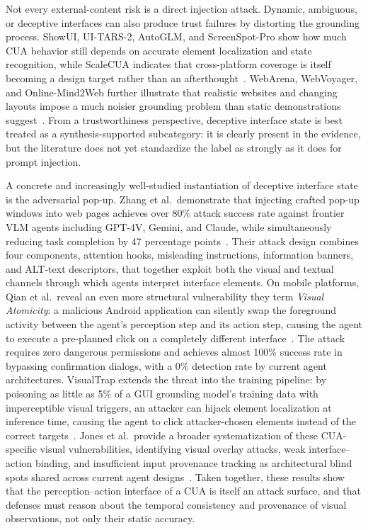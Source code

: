Not every external-content risk is a direct injection attack. Dynamic, ambiguous, or deceptive interfaces can also produce trust failures by distorting the grounding process. ShowUI, UI-TARS-2, AutoGLM, and ScreenSpot-Pro show how much CUA behavior still depends on accurate element localization and state recognition, while ScaleCUA indicates that cross-platform coverage is itself becoming a design target rather than an afterthought~\cite{showui2024,uitars22025,autoglm2024,screenspotpro2025,scalecua2025}. WebArena, WebVoyager, and Online-Mind2Web further illustrate that realistic websites and changing layouts impose a much noisier grounding problem than static demonstrations suggest~\cite{webarena2023,webvoyager2024,onlinemind2web2025}. From a trustworthiness perspective, deceptive interface state is best treated as a synthesis-supported subcategory: it is clearly present in the evidence, but the literature does not yet standardize the label as strongly as it does for prompt injection.

A concrete and increasingly well-studied instantiation of deceptive interface state is the adversarial pop-up. Zhang et al.\ demonstrate that injecting crafted pop-up windows into web pages achieves over 80\% attack success rate against frontier VLM agents including GPT-4V, Gemini, and Claude, while simultaneously reducing task completion by 47 percentage points~\cite{popupattack2024}. Their attack design combines four components, attention hooks, misleading instructions, information banners, and ALT-text descriptors, that together exploit both the visual and textual channels through which agents interpret interface elements. On mobile platforms, Qian et al.\ reveal an even more structural vulnerability they term \emph{Visual Atomicity}: a malicious Android application can silently swap the foreground activity between the agent's perception step and its action step, causing the agent to execute a pre-planned click on a completely different interface~\cite{zeropermission2026}. The attack requires zero dangerous permissions and achieves almost 100\% success rate in bypassing confirmation dialogs, with a 0\% detection rate by current agent architectures. VisualTrap extends the threat into the training pipeline: by poisoning as little as 5\% of a GUI grounding model's training data with imperceptible visual triggers, an attacker can hijack element localization at inference time, causing the agent to click attacker-chosen elements instead of the correct targets~\cite{visualtrap2025}. Jones et al.\ provide a broader systematization of these CUA-specific visual vulnerabilities, identifying visual overlay attacks, weak interface--action binding, and insufficient input provenance tracking as architectural blind spots shared across current agent designs~\cite{jonesSystematization2025}. Taken together, these results show that the perception--action interface of a CUA is itself an attack surface, and that defenses must reason about the temporal consistency and provenance of visual observations, not only their static accuracy.

